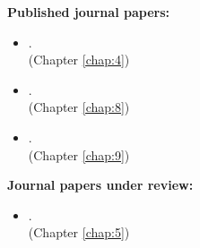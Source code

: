 \textbf{Published journal papers:}
\begin{itemize}
\item {}. \\ \null \hfill (Chapter \ref{chap:4})
\item {}. \\ \null \hfill (Chapter \ref{chap:8})
\item {}. \\ \null \hfill (Chapter \ref{chap:9})
\end{itemize}

\textbf{Journal papers under review:}
\begin{itemize}
\item {}. \\ \null \hfill (Chapter \ref{chap:5})
\end{itemize}